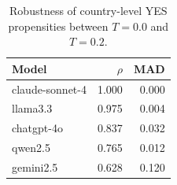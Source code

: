 \begin{table}
\caption{Robustness of country-level YES propensities between $T{=}0.0$ and $T{=}0.2$.}
\label{tab:robustness_t00_t20}
\begin{tabular}{lrr}
\toprule
Model & $\rho$ & MAD \\
\midrule
claude-sonnet-4 & 1.000 & 0.000 \\
llama3.3 & 0.975 & 0.004 \\
chatgpt-4o & 0.837 & 0.032 \\
qwen2.5 & 0.765 & 0.012 \\
gemini2.5 & 0.628 & 0.120 \\
\bottomrule
\end{tabular}
\end{table}
